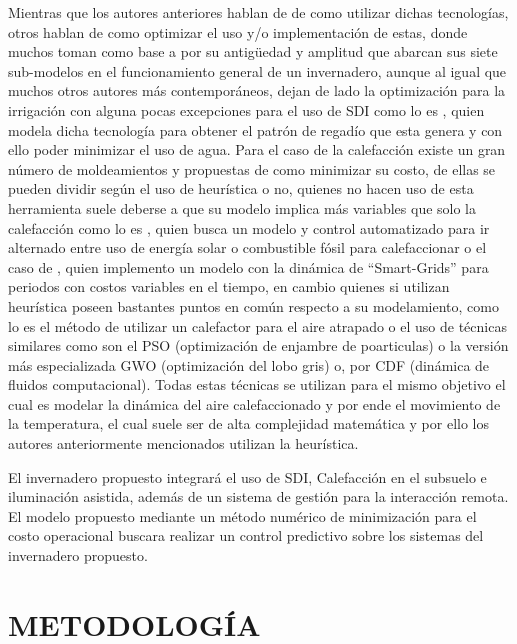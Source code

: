 \documentclass[letterpaper,conference]{IEEEtran}
\begin{document}
Mientras que los autores anteriores hablan de de como utilizar dichas tecnologías, otros hablan de como optimizar el uso y/o implementación de estas, donde muchos toman como base a \cite{Gijzen1998} por su antigüedad y amplitud que abarcan sus siete sub-modelos en el funcionamiento general de un invernadero, aunque al igual que muchos otros autores más contemporáneos, dejan de lado la optimización para la irrigación con alguna pocas excepciones para el uso de SDI como lo es \parencite{Kandelous2010}, quien modela dicha tecnología para obtener el patrón de regadío que esta genera y con ello poder minimizar el uso de agua. Para el caso de la calefacción existe un gran número de moldeamientos y propuestas de como minimizar su costo, de ellas se pueden dividir según el uso de heurística o no, quienes no hacen uso de esta herramienta suele deberse a que su modelo implica más variables que solo la calefacción como lo es \parencite{Kiyan2013}, quien busca un modelo y control automatizado para ir alternado entre uso de energía solar o combustible fósil para calefaccionar o el caso de \parencite{Bozchalui2015}, quien implemento un modelo con la dinámica de ``Smart-Grids'' para periodos con costos variables en el tiempo, en cambio quienes si utilizan heurística poseen bastantes puntos en común respecto a su modelamiento, como lo es el método de utilizar un calefactor para el aire atrapado o el uso de técnicas similares como son el PSO (optimización de enjambre de poarticulas) \parencite{Hasni2011,Chen2018} o la versión más especializada GWO (optimización del lobo gris) \parencite{Singhal2017} o, por CDF (dinámica de fluidos computacional). Todas estas técnicas se utilizan para el mismo objetivo el cual es modelar la dinámica del aire calefaccionado y por ende el movimiento de la temperatura, el cual suele ser de alta complejidad matemática \parencite{Singhal2017} y por ello los autores anteriormente mencionados utilizan la heurística.


El invernadero propuesto integrará el uso de SDI, Calefacción en el subsuelo e iluminación asistida, además de un sistema de gestión para la interacción remota.
El modelo propuesto mediante un método numérico de minimización  para el costo operacional buscara realizar un control predictivo sobre los sistemas del invernadero propuesto.




\section{METODOLOGÍA}
\end{document}
